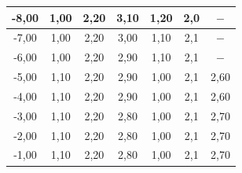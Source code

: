 \documentclass{article}
\begin{document}
\begin{table}[!ht]
\begin{tabular}{|c|c|c|c||c|c|c|}
-8,00                                                                                                              & 1,00                           & 2,20                          & 3,10                            & 1,20                           & 2,0                           & $-$                             \\ \hline
-7,00                                                                                                              & 1,00                           & 2,20                          & 3,00                            & 1,10                           & 2,1                           & $-$                             \\ \hline
-6,00                                                                                                              & 1,00                           & 2,20                          & 2,90                            & 1,10                           & 2,1                           & $-$                             \\ \hline
-5,00                                                                                                              & 1,10                           & 2,20                          & 2,90                            & 1,00                           & 2,1                           & 2,60                            \\ \hline
-4,00                                                                                                              & 1,10                           & 2,20                          & 2,90                            & 1,00                           & 2,1                           & 2,60                            \\ \hline
-3,00                                                                                                              & 1,10                           & 2,20                          & 2,80                            & 1,00                           & 2,1                           & 2,70                            \\ \hline
-2,00                                                                                                              & 1,10                           & 2,20                          & 2,80                            & 1,00                           & 2,1                           & 2,70                            \\ \hline
-1,00                                                                                                              & 1,10                           & 2,20                          & 2,80                            & 1,00                           & 2,1                           & 2,70                            \\ \hline

\end{tabular}
\end{table}
\end{document}
